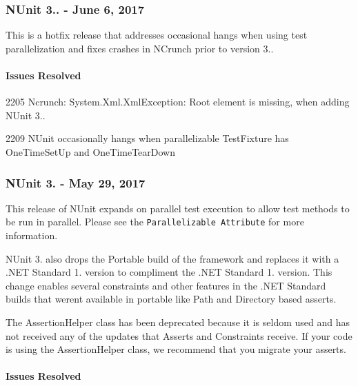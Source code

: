 \subsubsection*{N\+Unit 3.. -\/ June 6, 2017}

This is a hotfix release that addresses occasional hangs when using test parallelization and fixes crashes in N\+Crunch prior to version 3..

\paragraph*{Issues Resolved}


\begin{DoxyItemize}
\item 2205 Ncrunch\+: System.\+Xml.\+Xml\+Exception\+: Root element is missing, when adding N\+Unit 3..
\item 2209 N\+Unit occasionally hangs when parallelizable Test\+Fixture has One\+Time\+Set\+Up and One\+Time\+Tear\+Down
\end{DoxyItemize}

\subsubsection*{N\+Unit 3. -\/ May 29, 2017}

This release of N\+Unit expands on parallel test execution to allow test methods to be run in parallel. Please see the {\tt Parallelizable Attribute} for more information.

N\+Unit 3. also drops the Portable build of the framework and replaces it with a .N\+ET Standard 1. version to compliment the .N\+ET Standard 1. version. This change enables several constraints and other features in the .N\+ET Standard builds that weren\textquotesingle{}t available in portable like Path and Directory based asserts.

The Assertion\+Helper class has been deprecated because it is seldom used and has not received any of the updates that Asserts and Constraints receive. If your code is using the Assertion\+Helper class, we recommend that you migrate your asserts.

\paragraph*{Issues Resolved}


